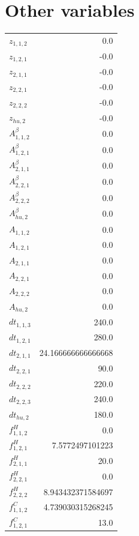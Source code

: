 \documentclass{article}%
\makeatletter
\let\mcnewpage=\newpage%
\newcommand{\TrickSupertabularIntoMulticols}{%
\renewcommand\newpage{%
\if@firstcolumn%
\hrule width\linewidth height0pt%
\columnbreak%
\else%
\mcnewpage%
\fi%
}%
}%
\makeatother
\begin{document}
\section{Other variables}%
\thispagestyle{plain}%
\begin{multicols*}{3}%
\TrickSupertabularIntoMulticols%
%
\begin{supertabular}{lr}%
	$z_{1,1,2}$ & 0.0 \\%
	$z_{1,2,1}$ & -0.0 \\%
	$z_{2,1,1}$ & -0.0 \\%
	$z_{2,2,1}$ & -0.0 \\%
	$z_{2,2,2}$ & -0.0 \\%
	$z_{hu,2}$ & -0.0 \\%
	$A_{1,1,2}^{\beta}$ & 0.0 \\%
	$A_{1,2,1}^{\beta}$ & 0.0 \\%
	$A_{2,1,1}^{\beta}$ & 0.0 \\%
	$A_{2,2,1}^{\beta}$ & 0.0 \\%
	$A_{2,2,2}^{\beta}$ & 0.0 \\%
	$A_{hu,2}^{\beta}$ & 0.0 \\%
	$A_{1,1,2}$ & 0.0 \\%
	$A_{1,2,1}$ & 0.0 \\%
	$A_{2,1,1}$ & 0.0 \\%
	$A_{2,2,1}$ & 0.0 \\%
	$A_{2,2,2}$ & 0.0 \\%
	$A_{hu,2}$ & 0.0 \\%
	$dt_{1,1,3}$ & 240.0 \\%
	$dt_{1,2,1}$ & 280.0 \\%
	$dt_{2,1,1}$ & 24.166666666666668 \\%
	$dt_{2,2,1}$ & 90.0 \\%
	$dt_{2,2,2}$ & 220.0 \\%
	$dt_{2,2,3}$ & 240.0 \\%
	$dt_{hu,2}$ & 180.0 \\%
	$f_{1,1,2}^{H}$ & 0.0 \\%
	$f_{1,2,1}^{H}$ & 7.5772497101223 \\%
	$f_{2,1,1}^{H}$ & 20.0 \\%
	$f_{2,2,1}^{H}$ & 0.0 \\%
	$f_{2,2,2}^{H}$ & 8.943432371584697 \\%
	$f_{1,1,2}^{C}$ & 4.739030315268245 \\%
	$f_{1,2,1}^{C}$ & 13.0 \\%

\end{supertabular}
\end{multicols*}
\end{document}
